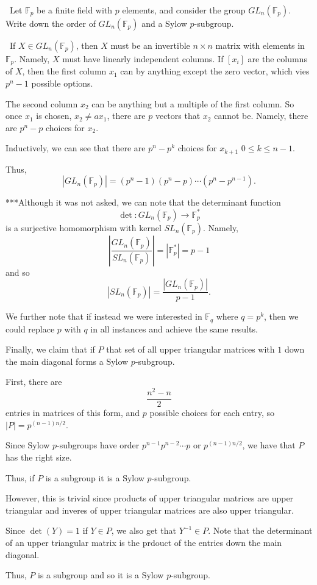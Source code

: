 \documentclass[12pt]{Qual}
\begin{document}
\begin{problem} $\,$
Let $\mathbb{F}_p$ be a finite field with $p$ elements, and consider the group $GL_n(\mathbb{F}_p)$. Write down the order of $GL_n(\mathbb{F}_p)$ and a Sylow $p$-subgroup.
\end{problem}


\begin{solution}$\,$
If $X\in GL_n(\mathbb{F}_p)$, then $X$ must be an invertible $n\times n$ matrix with elements in $\mathbb{F}_p$. Namely, $X$ must have linearly independent columns. If $[x_i]$ are the columns of $X$, then the first column $x_1$ can by anything except the zero vector, which vies $p^n-1$ possible options.

The second column $x_2$ can be anything but a multiple of the first column. So once $x_1$ is chosen, $x_2\not=ax_1$, there are $p$ vectors that $x_2$ cannot be. Namely, there are $p^n-p$ choices for $x_2$.

Inductively, we can see that there are $p^n-p^k$ choices for $x_{k+1}$ $0\le k\le n-1$.

Thus, $$|GL_n(\mathbb{F}_p)|=(p^n-1)(p^n-p)\cdots(p^n-p^{n-1}).$$

\begin{mybox}
***Although it was not asked, we can note that the determinant function $$\det:GL_n(\mathbb{F}_p)\to\mathbb{F}_p^*$$ is a surjective homomorphism with kernel $SL_n(\mathbb{F}_p)$. Namely, $$\left|\frac{GL_n(\mathbb{F}_p)}{SL_n(\mathbb{F}_p)}\right|=|\mathbb{F}_p^*|=p-1$$ and so $$|SL_n(\mathbb{F}_p)|=\frac{|GL_n(\mathbb{F}_p)|}{p-1}.$$

We further note that if instead we were interested in $\mathbb{F}_q$ where $q=p^k$, then we could replace $p$ with $q$ in all instances and achieve the same results.
\end{mybox}

Finally, we claim that if $P$ that set of all upper triangular matrices with $1$ down the main diagonal forms a Sylow $p$-subgroup.

First, there are $$\frac{n^2-n}{2}$$ entries in matrices of this form, and $p$ possible choices for each entry, so $|P|=p^{(n-1)n/2}$.

Since Sylow $p$-subgroups have order $p^{n-1}p^{n-2}\cdots p$ or $p^{(n-1)n/2}$, we have that $P$ has the right size.

Thus, if $P$ is a subgroup it is a Sylow $p$-subgroup.

However, this is trivial since products of upper triangular matrices are upper triangular and inveres of upper triangular matrices are also upper triangular.

Since $\det(Y)=1$ if $Y\in P$, we also get that $Y^{-1}\in P$. Note that the determinant of an upper triangular matrix is the prdouct of the entries down the main diagonal.

Thus, $P$ is a subgroup and so it is a Sylow $p$-subgroup.
\end{solution}
\newpage
\end{document}
